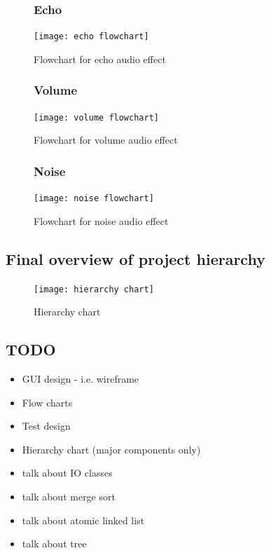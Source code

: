 \begin{figure}[H]
	\subsubsection{Echo}
	\texttt{[image: echo flowchart]}
	\caption{Flowchart for echo audio effect}
\end{figure}

\begin{figure}[H]
	\subsubsection{Volume}
	\texttt{[image: volume flowchart]}
	\caption{Flowchart for volume audio effect}
\end{figure}

\begin{figure}[H]
	\subsubsection{Noise}
	\texttt{[image: noise flowchart]}
	\caption{Flowchart for noise audio effect}
\end{figure}

\pagebreak
\subsection{Final overview of project hierarchy}
\begin{figure}[H]
	\texttt{[image: hierarchy chart]}
	\caption{Hierarchy chart }
\end{figure}

\pagebreak
\subsection{TODO}
\begin{itemize}
	\item GUI design - i.e. wireframe
	\item Flow charts
	\item Test design
	\item Hierarchy chart (major components only)
	\item talk about IO classes
	\item talk about merge sort
	\item talk about atomic linked list
	\item talk about tree
\end{itemize}